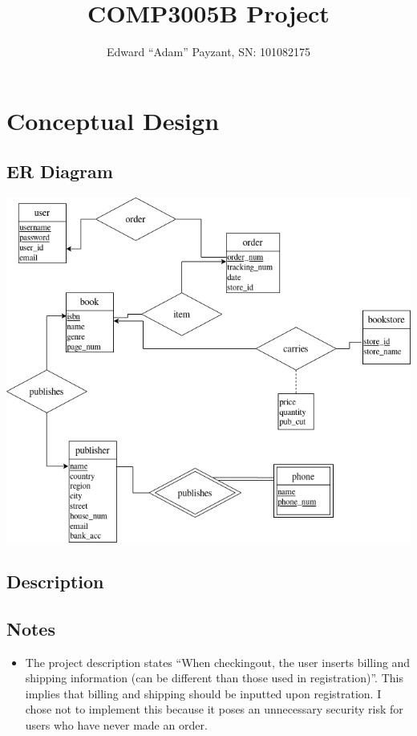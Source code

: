 \documentclass[titlepage, oneside]{article}
\author{Edward ``Adam'' Payzant, SN: 101082175}
\title{COMP3005B Project}
\begin{document}
    \maketitle
    \section{Conceptual Design}
        \subsection{ER Diagram}
            \begin{center}
                \includegraphics[scale=.65]{images/ERDiagram.png}
            \end{center}
        \subsection{Description}
        \subsection{Notes}
            \begin{itemize}
                \item The project description states ``When checkingout,  the user inserts billing and shipping information (can be different than those used in registration)''.
                This implies that billing and shipping should be inputted upon registration. I chose not to implement this because it poses an unnecessary security risk for users who have never made an order.
            \end{itemize}
\end{document}
